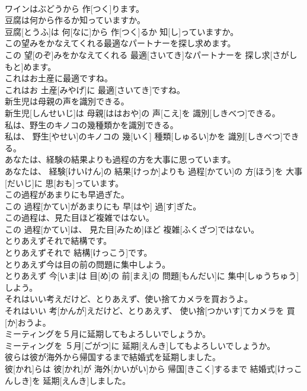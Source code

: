 \documentclass[8pt]{extreport}
\begin{document}
\begin{CJK}{UTF8}{min}
\\	ワインはぶどうから 作[つく]ります。	
\\	豆腐は何から作るか知っていますか。	
\\	豆腐[とうふ]は 何[なに]から 作[つく]るか 知[し]っていますか。	
\\	この望みをかなえてくれる最適なパートナーを探し求めます。	
\\	この 望[のぞ]みをかなえてくれる 最適[さいてき]なパートナーを 探し求[さがしもと]めます。	
\\	これはお土産に最適ですね。	
\\	これはお 土産[みやげ]に 最適[さいてき]ですね。	
\\	新生児は母親の声を識別できる。	
\\	新生児[しんせいじ]は 母親[ははおや]の 声[こえ]を 識別[しきべつ]できる。	
\\	私は、野生のキノコの幾種類かを識別できる。	
\\	私は、 野生[やせい]のキノコの 幾[いく] 種類[しゅるい]かを 識別[しきべつ]できる。	
\\	あなたは、経験の結果よりも過程の方を大事に思っています。	
\\	あなたは、 経験[けいけん]の 結果[けっか]よりも 過程[かてい]の 方[ほう]を 大事[だいじ]に 思[おも]っています。	
\\	この過程があまりにも早過ぎた。	
\\	この 過程[かてい]があまりにも 早[はや] 過[す]ぎた。	
\\	この過程は、見た目ほど複雑ではない。	
\\	この 過程[かてい]は、 見た目[みため]ほど 複雑[ふくざつ]ではない。	
\\	とりあえずそれで結構です。	
\\	とりあえずそれで 結構[けっこう]です。	
\\	とりあえず今は目の前の問題に集中しよう。	
\\	とりあえず 今[いま]は 目[め]の 前[まえ]の 問題[もんだい]に 集中[しゅうちゅう]しよう。	
\\	それはいい考えだけど、とりあえず、使い捨てカメラを買おうよ。	
\\	それはいい 考[かんが]えだけど、とりあえず、 使い捨[つかいす]てカメラを 買[か]おうよ。	
\\	ミーティングを５月に延期してもよろしいでしょうか。	
\\	ミーティングを ５月[ごがつ]に 延期[えんき]してもよろしいでしょうか。	
\\	彼らは彼が海外から帰国するまで結婚式を延期しました。	
\\	彼[かれ]らは 彼[かれ]が 海外[かいがい]から 帰国[きこく]するまで 結婚式[けっこんしき]を 延期[えんき]しました。	

\end{CJK}
\end{document}
